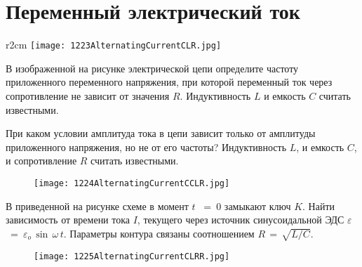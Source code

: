 \section{Переменный электрический ток}

\begin{wrapfigure}{r}{2cm}
\texttt{[image: 1223AlternatingCurrentCLR.jpg]}
\end{wrapfigure}

\AddProb В изображенной на рисунке электрической цепи определите частоту приложенного переменного напряжения, 
при которой переменный ток через сопротивление не зависит от значения $R$. Индуктивность $L$ и емкость $C$ считать известными.

\AddProb При каком условии амплитуда тока в цепи зависит только от амплитуды приложенного напряжения, 
но не от его частоты? Индуктивность $L$, и емкость $C$, и сопротивление $R$ считать известными.

\begin{figure}[!h]
\texttt{[image: 1224AlternatingCurrentCCLR.jpg]}
\end{figure}

\AddProb В приведенной на рисунке схеме в момент $t$~ =~0 замыкают ключ $K$. Найти зависимость от времени тока $I$, 
текущего через источник синусоидальной ЭДС {\Large $\varepsilon$}~=~{\Large $\varepsilon_o$}\,$\sin\,\omega\,t$.
Параметры контура связаны соотношением $R\,=\,\sqrt{L/C}$.

\begin{figure}[!h]
\texttt{[image: 1225AlternatingCurrentCLRR.jpg]}
\end{figure}